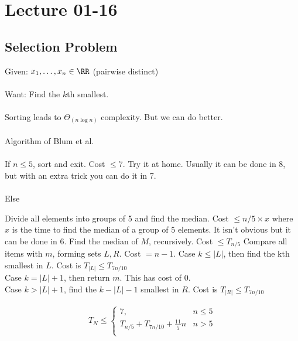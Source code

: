 \documentclass[class=scrartcl, crop=false]{standalone}
\date{2020-01-16}
\begin{document}
\section{Lecture 01-16}

\subsection{Selection Problem}

Given: $x_1, \dots, x_n \in \RR$ (pairwise distinct)
\\\\
Want: Find the $k$th smallest.
\\\\
Sorting leads to $\Theta_(n \log n)$ complexity. But we can do better.
\\\\
Algorithm of Blum et al.
\\\\
If $n \leq 5$, sort and exit. Cost $\leq 7$. Try it at home. Usually it can be done in 8, but with an extra trick you can do it in 7.
\\\\
Else
\begin{enumerate}
  \ii
  Divide all elements into groups of 5 and find the median. Cost $\leq n / 5 \times x$ where $x$ is the time to find the median of a group of 5 elements. It isn't obvious but it can be done in 6.
  \ii
  Find the median of $M$, recursively. Cost $\leq T_{n / 5}$
  \ii
  Compare all items with $m$, forming sets $L, R$. Cost $= n - 1$.
  \ii
  Case $k \leq |L|$, then find the  kth smallest in $L$. Cost is $T_{|L|} \leq T_{7n / 10}$
  \\
  Case $k = |L| + 1$, then return $m$. This has cost of 0.
  \\
  Case $k > |L| + 1$, find the $k - |L| - 1$ smallest in $R$. Cost is $T_{|R|} \leq T_{7n / 10}$
  
\end{enumerate} 
\begin{gather*}
  T_N \leq
  \begin{cases}
    7, & n \leq 5 \\
    T_{n / 5} + T_{7n / 10} + \frac{11}{5}n & n > 5 \\
  \end{cases} 
\end{gather*} 
\end{document}
